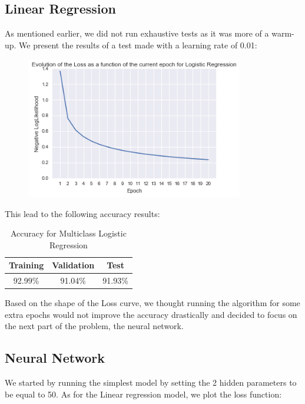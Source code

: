 \documentclass[11pt]{article}
\begin{document}
\subsection{Linear Regression}
As mentioned earlier, we did not run exhaustive tests as it was more of a warm-up. We present the results of a test made with a learning rate of 0.01:

\begin{figure}[h]
\centering
\includegraphics[width=9.5cm]{logReg_err}
\end{figure}

\noindent This lead to the following accuracy results:

\begin{table}[H]
\centering
\label{my-label}
\begin{tabular}{|c|c|c|}
\hline
Training & Validation & Test    \\ \hline
92.99\%  & 91.04\%    & 91.93\% \\ \hline
\end{tabular}
\caption{Accuracy for Multiclass Logistic Regression}
\end{table}

\noindent Based on the shape of the Loss curve, we thought running the algorithm for some extra epochs would not improve the accuracy drastically and decided to focus on the next part of the problem, the neural network.

\subsection{Neural Network}

We started by running the simplest model by setting the 2 hidden parameters to be equal to 50. As for the Linear regression model, we plot the loss function:
\end{document}
